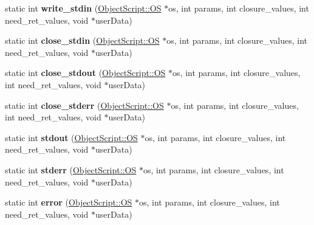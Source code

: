 \begin{DoxyCompactItemize}
\item 
static int {\bfseries write\+\_\+stdin} (\hyperlink{class_object_script_1_1_o_s}{Object\+Script\+::\+OS} $\ast$os, int params, int closure\+\_\+values, int need\+\_\+ret\+\_\+values, void $\ast$user\+Data)\hypertarget{struct_o_s_sub_process_adad2a7f4bc580b11e9437a9520d00f4a}{}\label{struct_o_s_sub_process_adad2a7f4bc580b11e9437a9520d00f4a}

\item 
static int {\bfseries close\+\_\+stdin} (\hyperlink{class_object_script_1_1_o_s}{Object\+Script\+::\+OS} $\ast$os, int params, int closure\+\_\+values, int need\+\_\+ret\+\_\+values, void $\ast$user\+Data)\hypertarget{struct_o_s_sub_process_a46c666f699548ae0b0d1ccc0640b2b6c}{}\label{struct_o_s_sub_process_a46c666f699548ae0b0d1ccc0640b2b6c}

\item 
static int {\bfseries close\+\_\+stdout} (\hyperlink{class_object_script_1_1_o_s}{Object\+Script\+::\+OS} $\ast$os, int params, int closure\+\_\+values, int need\+\_\+ret\+\_\+values, void $\ast$user\+Data)\hypertarget{struct_o_s_sub_process_a316f590c4e8b23ea5afbd8f899dfd4b5}{}\label{struct_o_s_sub_process_a316f590c4e8b23ea5afbd8f899dfd4b5}

\item 
static int {\bfseries close\+\_\+stderr} (\hyperlink{class_object_script_1_1_o_s}{Object\+Script\+::\+OS} $\ast$os, int params, int closure\+\_\+values, int need\+\_\+ret\+\_\+values, void $\ast$user\+Data)\hypertarget{struct_o_s_sub_process_acd7a70a376b70699b1417337224f4070}{}\label{struct_o_s_sub_process_acd7a70a376b70699b1417337224f4070}

\item 
static int {\bfseries stdout} (\hyperlink{class_object_script_1_1_o_s}{Object\+Script\+::\+OS} $\ast$os, int params, int closure\+\_\+values, int need\+\_\+ret\+\_\+values, void $\ast$user\+Data)\hypertarget{struct_o_s_sub_process_a75c36d4d7f49f733f84908940a050d1c}{}\label{struct_o_s_sub_process_a75c36d4d7f49f733f84908940a050d1c}

\item 
static int {\bfseries stderr} (\hyperlink{class_object_script_1_1_o_s}{Object\+Script\+::\+OS} $\ast$os, int params, int closure\+\_\+values, int need\+\_\+ret\+\_\+values, void $\ast$user\+Data)\hypertarget{struct_o_s_sub_process_ad7926f2918126c89cacc4c3207bffbf8}{}\label{struct_o_s_sub_process_ad7926f2918126c89cacc4c3207bffbf8}

\item 
static int {\bfseries error} (\hyperlink{class_object_script_1_1_o_s}{Object\+Script\+::\+OS} $\ast$os, int params, int closure\+\_\+values, int need\+\_\+ret\+\_\+values, void $\ast$user\+Data)\hypertarget{struct_o_s_sub_process_a324edb47ccacef2153da5ec9aaf8712d}{}\label{struct_o_s_sub_process_a324edb47ccacef2153da5ec9aaf8712d}


\end{DoxyCompactItemize}
